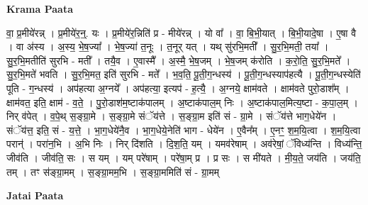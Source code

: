 \documentclass[17pt]{extarticle}
\begin{document}
\textbf{Krama Paata} \newline

वा॒ प्र॒मीये॑रन्न् । प्र॒मीये॑र॒न्॒. यः । प्र॒मीये॑र॒न्निति॑ प्र - मीये॑रन्न् । यो वा᳚ । वा॒ बि॒भी॒यात् । बि॒भी॒यादे॒षा । ए॒षा वै । वा अ॑स्य । अ॒स्य॒ भे॒ष॒ज्या᳚ । भे॒ष॒ज्या॑ त॒नूः । त॒नूर् यत् । यथ् सु॑रभि॒मती᳚ । सु॒र॒भि॒मती॒ तया᳚ । सु॒र॒भि॒मतीति॑ सुरभि - मती᳚ । तयै॒व । ए॒वास्मै᳚ । अ॒स्मै॒ भे॒ष॒जम् । भे॒ष॒जम् क॑रोति । क॒रो॒ति॒ सु॒र॒भि॒मते᳚ । सु॒र॒भि॒मते॑ भवति । सु॒र॒भि॒मत॒ इति॑ सुरभि - मते᳚ । भ॒व॒ति॒ पू॒ती॒ग॒न्धस्य॑ । पू॒ती॒ग॒न्धस्याप॑हत्यै । पू॒ती॒ग॒न्धस्येति॑ पूति - ग॒न्धस्य॑ । अप॑हत्या अ॒ग्नये᳚ । अप॑हत्या॒ इत्यप॑ - ह॒त्यै॒ । अ॒ग्नये॒ क्षाम॑वते । क्षाम॑वते पुरो॒डाश᳚म् । क्षाम॑वत॒ इति॒ क्षाम॑ - व॒ते॒ । पु॒रो॒डाश॑म॒ष्टाक॑पालम् । अ॒ष्टाक॑पाल॒म् निः । अ॒ष्टाक॑पाल॒मित्य॒ष्टा - क॒पा॒ल॒म् । निर् व॑पेत् । व॒पे॒थ् स॒ङ्ग्रा॒मे । स॒ङ्ग्रा॒मे संॅय॑त्ते । स॒ङ्ग्रा॒म इति॑ सं - ग्रा॒मे । संॅय॑त्ते भाग॒धेये॑न । संॅय॑त्त॒ इति॒ सं - य॒त्ते॒ । भा॒ग॒धेये॑नै॒व । भा॒ग॒धेये॒नेति॑ भाग - धेये॑न । ए॒वैन᳚म् । ए॒नꣳ॒॒ श॒म॒यि॒त्वा । श॒म॒यि॒त्वा परान्॑ । परा॑न॒भि । अ॒भि निः । निर् दि॑शति । दि॒श॒ति॒ यम् । यमव॑रेषाम् । अव॑रेषां॒ ॅविध्य॑न्ति । विध्य॑न्ति॒ जीव॑ति । जीव॑ति॒ सः । स यम् । यम् परे॑षाम् । परे॑षा॒म् प्र । प्र सः । स मी॑यते । मी॒य॒ते॒ जय॑ति । जय॑ति॒ तम् । तꣳ स॑ङ्ग्रा॒मम् । स॒ङ्ग्रा॒मम॒भि । स॒ङ्ग्रा॒ममिति॑ सं - ग्रा॒मम् \newline

\textbf{Jatai Paata} \newline
\end{document}
